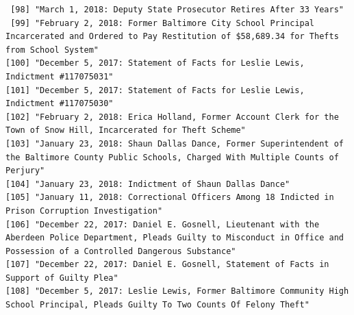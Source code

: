 \documentclass[
  letterpaper,
  DIV=11,
  numbers=noendperiod]{scrreprt}
\begin{document}
\begin{verbatim}
 [98] "March 1, 2018: Deputy State Prosecutor Retires After 33 Years"                                                                                                                                                                                       
 [99] "February 2, 2018: Former Baltimore City School Principal Incarcerated and Ordered to Pay Restitution of $58,689.34 for Thefts from School System"                                                                                                    
[100] "December 5, 2017: Statement of Facts for Leslie Lewis, Indictment #117075031"                                                                                                                                                                        
[101] "December 5, 2017: Statement of Facts for Leslie Lewis, Indictment #117075030"                                                                                                                                                                        
[102] "February 2, 2018: Erica Holland, Former Account Clerk for the Town of Snow Hill, Incarcerated for Theft Scheme"                                                                                                                                      
[103] "January 23, 2018: Shaun Dallas Dance, Former Superintendent of the Baltimore County Public Schools, Charged With Multiple Counts of Perjury"                                                                                                         
[104] "January 23, 2018: Indictment of Shaun Dallas Dance"                                                                                                                                                                                                  
[105] "January 11, 2018: Correctional Officers Among 18 Indicted in Prison Corruption Investigation"                                                                                                                                                        
[106] "December 22, 2017: Daniel E. Gosnell, Lieutenant with the Aberdeen Police Department, Pleads Guilty to Misconduct in Office and Possession of a Controlled Dangerous Substance"                                                                      
[107] "December 22, 2017: Daniel E. Gosnell, Statement of Facts in Support of Guilty Plea"                                                                                                                                                                  
[108] "December 5, 2017: Leslie Lewis, Former Baltimore Community High School Principal, Pleads Guilty To Two Counts Of Felony Theft"                                                                                                                       

\end{verbatim}
\end{document}
